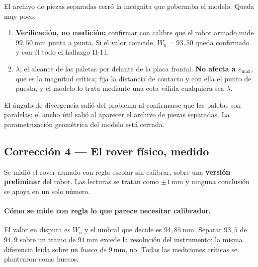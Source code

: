 \documentclass[11pt,a4paper]{article}
\begin{document}
El archivo de piezas separadas cerró la incógnita que gobernaba el modelo. Queda muy
poco.

\begin{enumerate}[label=\textbf{\arabic*.},leftmargin=2.6em,itemsep=3pt]
\item \textbf{Verificación, no medición:} confirmar con calibre que el robot armado mide
      $99{,}50\ \mathrm{mm}$ punta a punta. Si el valor coincide, $W_u = 93{,}50$ queda
      confirmado y con él todo el hallazgo H-11.
\item $\lambda$, el alcance de las paletas por delante de la placa frontal. \textbf{No
      afecta a $e_{\max}$}, que es la magnitud crítica; fija la distancia de contacto y
      con ella el punto de puesta, y el modelo lo trata mediante una cota válida
      cualquiera sea $\lambda$.
\end{enumerate}

El ángulo de divergencia salió del problema al confirmarse que las paletas son
paralelas; el ancho útil salió al aparecer el archivo de piezas separadas. La
parametrización geométrica del modelo está cerrada.

\subsection{Corrección 4 --- El rover físico, medido}
\label{sec:medido}

Se midió el rover armado con regla escolar sin calibrar, sobre una \textbf{versión
preliminar} del robot. Las lecturas se tratan como $\pm 1\ \mathrm{mm}$ y ninguna
conclusión se apoya en un solo número.

\paragraph{Cómo se mide con regla lo que parece necesitar calibrador.} El valor en disputa
es $W_u$ y el umbral que decide es $94{,}85\ \mathrm{mm}$. Separar $93{,}5$ de $94{,}9$
sobre un tramo de $94\ \mathrm{mm}$ excede la resolución del instrumento; la misma
diferencia leída sobre un \emph{hueco de $9\ \mathrm{mm}$}, no. Todas las mediciones
críticas se plantearon como huecos.
\end{document}
